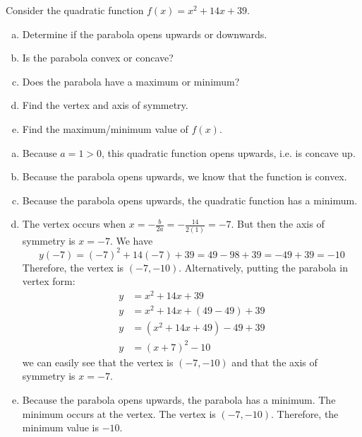 \documentclass[11pt,letterpaper]{article}
\begin{document}
\newpage



 Consider the quadratic function $f(x)= x^2 + 14x + 39$.
        \begin{enumerate}[(a)]
        \item Determine if the parabola opens upwards or downwards.
        \item Is the parabola convex or concave?
        \item Does the parabola have a maximum or minimum? 
        \item Find the vertex and axis of symmetry. 
        \item Find the maximum/minimum value of $f(x)$. 
        \end{enumerate} \pspace

\sol
\begin{enumerate}[(a)]
\item Because $a= 1 > 0$, this quadratic function opens upwards, i.e. is concave up. \pspace

\item Because the parabola opens upwards, we know that the function is convex. \pspace

\item Because the parabola opens upwards, the quadratic function has a minimum. \pspace

\item The vertex occurs when $x= -\frac{b}{2a}= -\frac{14}{2(1)}= -7$. But then the axis of symmetry is $x= -7$. We have
	\[
	y(-7)= (-7)^2 + 14(-7) + 39= 49 - 98 + 39= -49 + 39= -10
	\]
Therefore, the vertex is $(-7, -10)$. Alternatively, putting the parabola in vertex form:
	\[
	\begin{aligned}
	y&= x^2 + 14x + 39 \\[0.3cm]
	y&= x^2 + 14x + (49 - 49) + 39 \\[0.3cm]
	y&= (x^2 + 14x + 49) - 49 + 39 \\[0.3cm]
	y&= (x + 7)^2 - 10 
	\end{aligned}
	\]
we can easily see that the vertex is $(-7, -10)$ and that the axis of symmetry is $x= -7$. \pspace
 
\item Because the parabola opens upwards, the parabola has a minimum. The minimum occurs at the vertex. The vertex is $(-7, -10)$. Therefore, the minimum value is $-10$.  
\end{enumerate}
\end{document}

